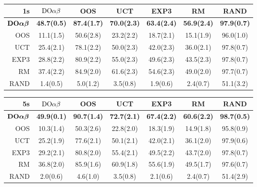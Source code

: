 \begin{table}[t!]
\centering
\begin{scriptsize}
\begin{tabular}{|r|cccccc|}\hline
1s &$\textrm{DO}\alpha\beta$&OOS&UCT&EXP3&RM&RAND\\\hline
$\textrm{\bf DO}\boldsymbol{\alpha\beta}$&\textbf{48.7(0.5)}&\textbf{87.4(1.7)}&\textbf{70.0(2.3)}&\textbf{63.4(2.4)}&\textbf{56.9(2.4)}&\textbf{97.9(0.7)}\\
OOS&11.1(1.5)&50.6(2.8)&23.2(2.2)&18.7(2.1)&15.1(1.9)&96.0(1.0)\\
UCT&25.4(2.1)&78.1(2.2)&50.0(2.3)&42.0(2.3)&36.0(2.1)&97.8(0.7)\\
EXP3&28.8(2.2)&80.9(2.2)&55.0(2.3)&49.6(2.3)&43.5(2.3)&97.8(0.7)\\
RM&37.4(2.2)&84.9(2.0)&61.6(2.3)&54.6(2.3)&49.0(2.0)&97.7(0.7)\\
RAND&1.4(0.5)&5.0(1.2)&3.5(0.8)&1.9(0.6)&2.4(0.7)&51.1(3.2)\\
\hline
\end{tabular}
\begin{tabular}{|r|cccccc|}\hline
5s&$\textrm{DO}\alpha\beta$&OOS&UCT&EXP3&RM&RAND\\\hline
$\textrm{\bf DO}\boldsymbol{\alpha\beta}$&\textbf{49.9(0.1)}&\textbf{90.7(1.4)}&\textbf{72.7(2.1)}&\textbf{67.4(2.2)}&\textbf{60.6(2.2)}&\textbf{98.7(0.5)}\\
OOS&10.3(1.4)&50.3(2.6)&22.8(2.0)&18.3(1.9)&14.9(1.8)&95.8(0.9)\\
UCT&25.2(1.9)&77.6(2.1)&50.1(2.1)&42.0(2.1)&36.1(2.0)&97.9(0.6)\\
EXP3&29.2(2.1)&80.8(2.0)&55.4(2.1)&49.5(2.2)&43.7(2.0)&97.8(0.7)\\
RM&36.8(2.0)&85.9(1.6)&60.9(1.8)&55.6(1.9)&49.5(1.7)&97.6(0.7)\\
RAND&2.0(0.6)&4.6(1.0)&3.5(0.8)&2.1(0.6)&2.4(0.7)&51.4(2.9)\\


\end{tabular}
\end{scriptsize}
\end{table}
